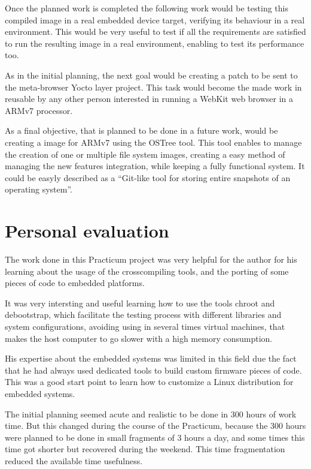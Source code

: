 \documentclass[a4paper,11pt,openany]{report}
\begin{document}
Once the planned work is completed the following work would be testing this compiled image in a real embedded device target, verifying its behaviour in a real environment. This would be very useful to test if all the requirements are satisfied to run the resulting image in a real environment, enabling to test its performance too.

As in the initial planning, the next goal would be creating a patch to be sent to the meta-browser Yocto layer project. This task would become the made work in reusable by any other person interested in running a WebKit web browser in a ARMv7 processor.

As a final objective, that is planned to be done in a future work, would be creating a image for ARMv7 using the OSTree\cite{ostree} tool. This tool enables to manage the creation of one or multiple file system images, creating a easy method of managing the new features integration, while keeping a fully functional system. It could be easyly described as a ``Git-like tool for storing entire snapshots of an operating system''.

\chapter{Personal evaluation}
The work done in this Practicum project was very helpful for the author for his learning about the usage of the crosscompiling tools, and the porting of some pieces of code to embedded platforms.

It was very intersting and useful learning how to use the tools chroot and debootstrap, which facilitate the testing process with different libraries and system configurations, avoiding using in several times virtual machines, that makes the host computer to go slower with a high memory consumption.

His expertise about the embedded systems was limited in this field due the fact that he had always used dedicated tools to build custom firmware pieces of code. This was a good start point to learn how to customize a Linux distribution for embedded systems.

The initial planning seemed acute and realistic to be done in 300 hours of work time. But this changed during the course of the Practicum, because the 300 hours were planned to be done in small fragments of 3 hours a day, and some times this time got shorter but recovered during the weekend. This time fragmentation reduced the available time usefulness.
\end{document}
